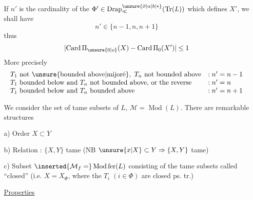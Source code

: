 
If $n'$ is the cardinality of the $ {\Phi}'\in\operatorname{Drap}_{\ll}^{\unsure{\partial|\alpha|b|*}}(\operatorname{Tr}(L))$ which defines $X'$, we shall have
\[
n'\in\{n-1,n,n+1\}
\]
thus
\[
\lvert\operatorname{Card}\Pi_{\unsure{0|o}}(X)-\operatorname{Card}\Pi_0(X')\rvert\leq 1
\]
More precisely
\[\begin{array}{ll}
T_1\ \text{not \unsure{bounded above|mijoré}},\ T_n\ \text{not bounded above} &: n'=n-1\\
T_1\ \text{bounded below and }T_n\ \text{not bounded above, or the reverse} &: n'=n\\
T_1\ \text{bounded below and }T_n\ \text{bounded above} &: n'=n+1
\end{array}\]

We consider the  set  of tame subsets of $L$, $\mathcal M=\operatorname{Mod}(L)$. There are remarkable structures

a) Order \quad $X\subset Y$

b) Relation : $\{X,Y\}$ tame \quad (NB $\unsure{x|X}\subset Y\Rightarrow\{X,Y\}$ tame)

c) Subset $\inserted{\mathcal M_f=}\operatorname{Mod}\mathrm{fer}(L)$ consisting of the tame subsets called ``closed'' (i.e. $X=X_{\Phi}$, where the $T_i$ $(i\in\Phi)$ are closed ps. tr.)

\uline{Properties}
